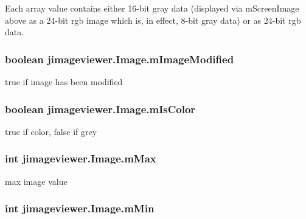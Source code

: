 Each array value contains either 16-bit gray data (displayed via m\-Screen\-Image above as a 24-bit rgb image which is, in effect, 8-bit gray data) or as 24-bit rgb data. 
\subsubsection{\setlength{\rightskip}{0pt plus 5cm}boolean {\bf jimageviewer.Image.m\-Image\-Modified}\hspace{0.3cm}{\tt  [package]}}\label{classjimageviewer_1_1_image_bba95c637c3a78d16a9e193b5ccbd5f5}


true if image has been modified 

\subsubsection{\setlength{\rightskip}{0pt plus 5cm}boolean {\bf jimageviewer.Image.m\-Is\-Color}\hspace{0.3cm}{\tt  [package]}}\label{classjimageviewer_1_1_image_c0fcba2785fce459542f2369ffb24840}


true if color, false if grey 

\subsubsection{\setlength{\rightskip}{0pt plus 5cm}int {\bf jimageviewer.Image.m\-Max}\hspace{0.3cm}{\tt  [package]}}\label{classjimageviewer_1_1_image_9769606824b1df18979317b4810cf444}


max image value 

\subsubsection{\setlength{\rightskip}{0pt plus 5cm}int {\bf jimageviewer.Image.m\-Min}\hspace{0.3cm}{\tt  [package]}}\label{classjimageviewer_1_1_image_ec1b8fbcdc6292c0ee533061d5f5d41e}


